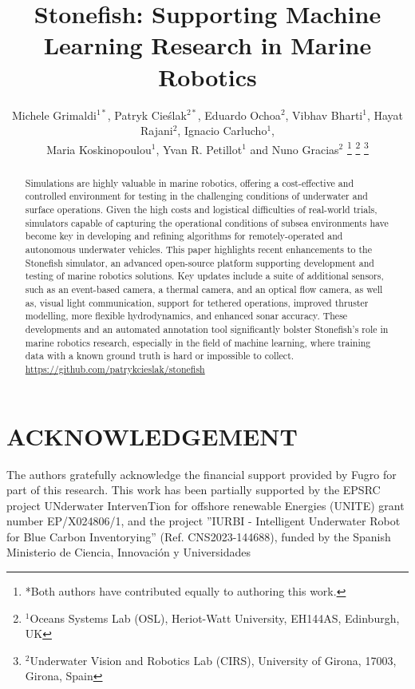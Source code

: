 \documentclass[letterpaper, 10 pt, conference]{ieeeconf}
\title{\LARGE \bf
Stonefish: Supporting Machine Learning Research in Marine Robotics
}
\author{Michele Grimaldi$^{1*}$,  Patryk Cie\'{s}lak$^{2*}$, Eduardo Ochoa$^{2}$, Vibhav Bharti$^{1}$, Hayat Rajani$^{2}$, Ignacio Carlucho$^{1}$, \\Maria Koskinopoulou$^{1}$, Yvan R. Petillot$^{1}$ and Nuno Gracias$^{2}$
\thanks{*Both authors have contributed equally to authoring this work.}
\thanks{$^{1}$Oceans Systems Lab (OSL), Heriot-Watt University, EH144AS, Edinburgh, UK}
\thanks{$^{2}$Underwater Vision and Robotics Lab (CIRS), University of Girona, 17003, Girona, Spain}
}
\begin{document}
\maketitle
\thispagestyle{empty}
\pagestyle{empty}

\begin{abstract}
Simulations are highly valuable in marine robotics, offering a cost-effective and controlled environment for testing in the challenging conditions of underwater and surface operations. Given the high costs and logistical difficulties of real-world trials, simulators capable of capturing the operational conditions of subsea environments  have become key in developing and refining algorithms for remotely-operated and autonomous underwater vehicles.
This paper highlights recent enhancements to the Stonefish simulator, an advanced open-source platform supporting development and testing of marine robotics solutions. Key updates include a suite of additional sensors, such as an event-based camera, a thermal camera, and an optical flow camera, as well as, visual light communication, support for tethered operations, improved thruster modelling, more flexible hydrodynamics, and enhanced sonar accuracy. These developments and an automated annotation tool significantly bolster Stonefish's role in marine robotics research, especially in the field of machine learning, where training data with a known ground truth is hard or impossible to collect. 
\url{https://github.com/patrykcieslak/stonefish}
\end{abstract}





\newpage
\section*{ACKNOWLEDGEMENT}
The authors gratefully acknowledge the financial support provided by Fugro for part of this research.
This work has been partially supported by the EPSRC project UNderwater IntervenTion for offshore renewable Energies (UNITE) grant number EP/X024806/1, and the project ”IURBI - Intelligent Underwater Robot for Blue Carbon Inventorying” (Ref. CNS2023-144688), funded by the Spanish Ministerio de Ciencia, Innovación y Universidades




\end{document}
